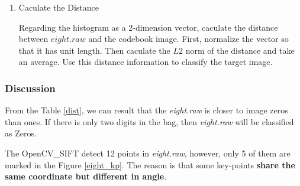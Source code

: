 \documentclass[11pt]{article}
\begin{document}
\begin{enumerate}
\item Caculate the Distance

Regarding the histogram as a 2-dimension vector, caculate the distance between $eight.raw$ and the codebook image. First, normalize the vector so that it has unit length. Then caculate the $L2$ norm of the distance and take an average. Use this distance information to classify the target image.
 
\end{enumerate} 

	
	
\subsubsection{Discussion}

From the Table \ref{dist}, we can result that the {\it eight.raw} is closer to image zeros than ones. If there is only two digits in the bag, then {\it eight.raw} will be classified as Zeros.

The OpenCV\_SIFT detect 12 points in {\it eight.raw}, however, only 5 of them are marked in the Figure \ref{eight_kp}. The reason is that some key-points {\bf share the same coordinate but different in angle}. 





%
%
%
\end{document}
